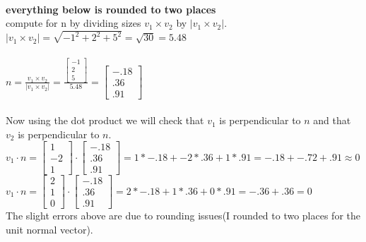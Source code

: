 \documentclass{article}
\begin{document}
\\
\textbf{everything below is rounded to two places}\\
compute for n by dividing sizes $v_1 \times v_2$ by $|v_1 \times v_2|$.\\
$|v_1 \times v_2|=\sqrt{-1^2 + 2^2 + 5^2}=\sqrt{30}=5.48$\\\\
$n=\frac{v_1 \times v_2}{|v_1 \times v_2|}=\frac{\begin{bmatrix}
-1 \\
2 \\
5
\end{bmatrix}}{5.48} = \begin{bmatrix}
-.18 \\
.36 \\
.91
\end{bmatrix}$ \\\\
Now using the dot product we will check that $v_1$ is perpendicular to $n$ and that $v_2$ is perpendicular to $n.$\\
$v_1 \cdot n = \begin{bmatrix}
1 \\
-2\\
1
\end{bmatrix} \cdot 
\begin{bmatrix}
-.18 \\
.36 \\
.91
\end{bmatrix}= 1*-.18+ -2*.36 + 1*.91= -.18+ -.72 + .91 \approx 0$ \\
$v_1 \cdot n = \begin{bmatrix}
2 \\
1\\
0
\end{bmatrix} \cdot 
\begin{bmatrix}
-.18 \\
.36 \\
.91
\end{bmatrix}= 2*-.18+ 1*.36 + 0*.91= -.36 + .36 = 0$
\\ The slight errors above are due to rounding issues(I rounded to two places for the unit normal vector).\\\\
\end{document}
